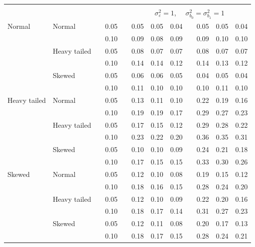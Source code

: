 \documentclass[12pt]{article} %
\begin{document}
\begin{table}[ht]
\begin{scriptsize}
\begin{center}
\begin{tabular}{ll p{.1cm} c p{.1cm} rrr p{.1cm} rrr}
&&&&&&&&&&&\\
& && && \multicolumn{7}{c}{$\sigma_{\varepsilon}^2 = 1$, \ \ $\sigma_{b_0}^2 = \sigma_{b_1}^2 = 1$} \\ \cline{6-12}
Normal       & Normal       && 0.05 &&  0.05 & 0.05 & 0.04 && 0.05 & 0.05 & 0.04 \\ 
             &              && 0.10 &&  0.09 & 0.08 & 0.09 && 0.09 & 0.10 & 0.10 \\ 
             & Heavy tailed && 0.05 &&  0.08 & 0.07 & 0.07 && 0.08 & 0.07 & 0.07 \\ 
             &              && 0.10 &&  0.14 & 0.14 & 0.12 && 0.14 & 0.13 & 0.12 \\ 
             & Skewed       && 0.05 &&  0.06 & 0.06 & 0.05 && 0.04 & 0.05 & 0.04 \\ 
             &              && 0.10 &&  0.11 & 0.10 & 0.10 && 0.10 & 0.11 & 0.10 \\ 
Heavy tailed & Normal       && 0.05 &&  0.13 & 0.11 & 0.10 && 0.22 & 0.19 & 0.16 \\ 
             &              && 0.10 &&  0.19 & 0.19 & 0.17 && 0.29 & 0.27 & 0.23 \\ 
             & Heavy tailed && 0.05 &&  0.17 & 0.15 & 0.12 && 0.29 & 0.28 & 0.22 \\ 
             &              && 0.10 &&  0.23 & 0.22 & 0.20 && 0.36 & 0.35 & 0.31 \\ 
             & Skewed       && 0.05 &&  0.10 & 0.10 & 0.09 && 0.24 & 0.21 & 0.18 \\ 
             &              && 0.10 &&  0.17 & 0.15 & 0.15 && 0.33 & 0.30 & 0.26 \\ 
Skewed       & Normal       && 0.05 &&  0.12 & 0.10 & 0.08 && 0.19 & 0.15 & 0.12 \\ 
             &              && 0.10 &&  0.18 & 0.16 & 0.15 && 0.28 & 0.24 & 0.20 \\ 
             & Heavy tailed && 0.05 &&  0.12 & 0.10 & 0.09 && 0.22 & 0.20 & 0.16 \\ 
             &              && 0.10 &&  0.18 & 0.17 & 0.14 && 0.31 & 0.27 & 0.23 \\ 
             & Skewed       && 0.05 &&  0.12 & 0.11 & 0.08 && 0.20 & 0.17 & 0.13 \\ 
             &              && 0.10 &&  0.18 & 0.17 & 0.15 && 0.28 & 0.24 & 0.21 \\ 



\end{tabular}
\end{center}
\end{scriptsize}
\end{table}
\end{document}
